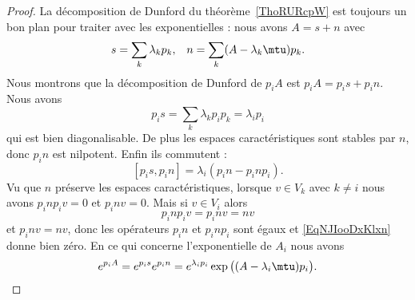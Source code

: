 \begin{proof}
    La décomposition de Dunford du théorème~\ref{ThoRURcpW} est toujours un bon plan pour traiter avec les exponentielles : nous avons \( A=s+n\) avec
    \begin{equation}
        \begin{aligned}[]
            s&=\sum_k\lambda_kp_k,&n=\sum_k(A-\lambda_k\mtu)p_k.
        \end{aligned}
    \end{equation}
    Nous montrons que la décomposition de Dunford de \( p_iA\) est \( p_iA=p_is+p_in\). Nous avons
    \begin{equation}
        p_is=\sum_k\lambda_kp_ip_k=\lambda_ip_i
    \end{equation}
    qui est bien diagonalisable. De plus les espaces caractéristiques sont stables par \( n\), donc \( p_in\) est nilpotent. Enfin ils commutent :
    \begin{equation}    \label{EqNJIooDxKlxn}
        [p_is,p_in]=\lambda_i(p_in-p_inp_i).
    \end{equation}
    Vu que \( n\) préserve les espaces caractéristiques, lorsque \( v\in V_k\) avec \( k\neq i\) nous avons \( p_inp_iv=0\) et \( p_inv=0\). Mais si \( v\in V_i\) alors
    \begin{equation}
        p_inp_iv=p_inv=nv
    \end{equation}
    et \( p_inv=nv\), donc les opérateurs \( p_in\) et \( p_inp_i\) sont égaux et \eqref{EqNJIooDxKlxn} donne bien zéro. En ce qui concerne l'exponentielle de \( A_i\) nous avons
    \begin{equation}
        e^{p_iA}= e^{p_is} e^{p_in}= e^{\lambda_ip_i} \exp\big( (A-\lambda_i\mtu)p_i\big).
    \end{equation}


\end{proof}
